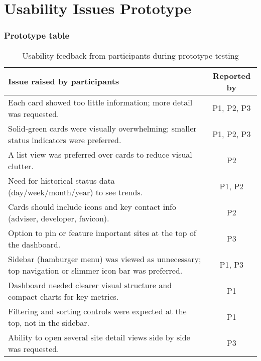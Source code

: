 \section{Usability Issues Prototype}
\label{app:usability_issues_prototype}

\subsubsection{Prototype table}
\begin{table}[H]
\centering
\begin{tabular}{|p{8.2cm}|c|}
\hline
\textbf{Issue raised by participants} & \textbf{Reported by} \\ \hline
Each card showed too little information; more detail was requested.& P1, P2, P3 \\ \hline
Solid‑green cards were visually overwhelming; smaller status indicators were preferred. & P1, P2, P3 \\ \hline
A list view was preferred over cards to reduce visual clutter. & P2 \\ \hline
Need for historical status data (day/week/month/year) to see trends. & P1, P2 \\ \hline
Cards should include icons and key contact info (adviser, developer, favicon). & P2 \\ \hline
Option to pin or feature important sites at the top of the dashboard. & P3 \\ \hline
Sidebar (hamburger menu) was viewed as unnecessary; top navigation or slimmer icon bar was preferred. & P1, P3 \\ \hline
Dashboard needed clearer visual structure and compact charts for key metrics. & P1 \\ \hline
Filtering and sorting controls were expected at the top, not in the sidebar. & P1 \\ \hline
Ability to open several site detail views side by side was requested. & P3 \\ \hline
\end{tabular}
\caption{Usability feedback from participants during prototype testing}
\label{tab:prototype-issues}
\end{table}